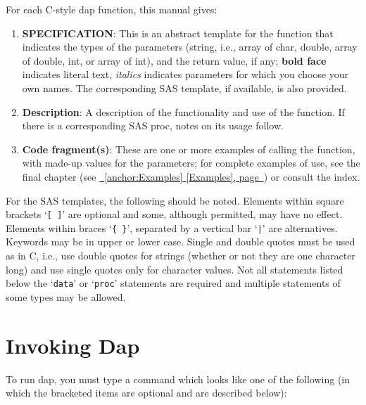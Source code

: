 \documentclass{book}
\newcommand\Texinfocommandstyletextvar[1]{{\normalfont{}\textsl{#1}}}%
\renewcommand{\_}{\Texinfounderscore\discretionary{}{}{}}
\begin{document}
For each C-style dap function, this manual
%
%
gives:

\begin{enumerate}[start=1]
\item \textbf{SPECIFICATION}: This is an abstract template for the function that indicates the
types of the parameters (string,
%
%
%
i.e., array of char, double, array of double, int,
or array of int), and the return value, if any; \textbf{bold face} indicates
literal text, \Texinfocommandstyletextvar{italics} indicates parameters for which you choose your own
names. The corresponding SAS template, if available, is also provided.

\item \textbf{Description}: A description of the functionality and use of the function.
If there is a corresponding SAS proc, notes on its usage follow.

\item \textbf{Code fragment(s)}: These are one or more examples of calling the function, with made-up values
for the parameters; for complete examples of use, see the final chapter
(see \hyperref[anchor:Examples]{\chaptername~\ref*{anchor:Examples} [Examples], page~\pageref*{anchor:Examples}}) or consult the index.  
\end{enumerate}

%
For the SAS templates, the following should be noted.
Elements within square brackets `\texttt{[ ]}' are optional and
some, although permitted, may have no effect.
Elements within braces `\texttt{\{\ \}}', separated by a vertical bar `\texttt{|}' are
alternatives.
Keywords may be in upper or lower case.
Single and double quotes must be used as in C, i.e., use double quotes
for strings (whether or not they are one character long) and
use single quotes only for character values.
Not all statements listed below the `\texttt{data}' or `\texttt{proc}'
statements are required and multiple statements of some types may be allowed.

\section{{Invoking Dap}}
\label{anchor:Invoking-Dap}%
%
%

To run dap, you must type a command which looks like one of the following
(in which the bracketed items are optional and are described below):
\end{document}
